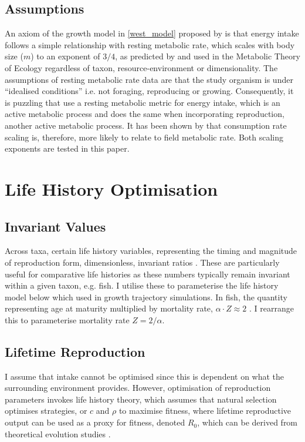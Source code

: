 \documentclass[a4paper]{article} %
\begin{document}
\subsection{Assumptions}
An axiom of the growth model in \cref{west_model} proposed by \textcite{West2001} is that energy intake follows a simple relationship with resting metabolic rate, which scales with body size ($m$) to an exponent of $3/4$, as predicted by \textcite{West1997} and used in the Metabolic Theory of Ecology \autocite{Brown2004} regardless of taxon, resource-environment or dimensionality. The assumptions of resting metabolic rate data are that the study organism is under ``idealised conditions'' i.e. not foraging, reproducing or growing. Consequently, it is puzzling that \textcite{West2001} use a resting metabolic metric for energy intake, which is an active metabolic process and \textcite{Charnov2001} does the same when incorporating reproduction, another active metabolic process. It has been shown by \textcite{Pawar2012} that consumption rate scaling is, therefore, more likely to relate to field metabolic rate. Both scaling exponents are tested in this paper.


\section{Life History Optimisation}
\subsection{Invariant Values}
Across taxa, certain life history variables, representing the timing and magnitude of reproduction form, dimensionless, invariant ratios \autocite{Charnov1993}. These are particularly useful for comparative life histories as these numbers typically remain invariant within a given taxon, e.g. fish. I utilise these to parameterise the life history model below which used in growth trajectory simulations. In fish, the quantity representing age at maturity multiplied by mortality rate, $\alpha\cdot Z \approx 2$ \autocite{Charnov2001}. I rearrange this to parameterise mortality rate $Z = 2/{\alpha}$.

\subsection{Lifetime Reproduction}
I assume that intake cannot be optimised since this is dependent on what the surrounding environment provides. However, optimisation of reproduction parameters invokes life history theory, which assumes that natural selection optimises strategies, or $c$ and $\rho$ to maximise fitness, where lifetime reproductive output can be used as a proxy for fitness, denoted $R_0$, which can be derived from theoretical evolution studies \autocite{Charnov2001, stearns1992evolution}.
\end{document}
